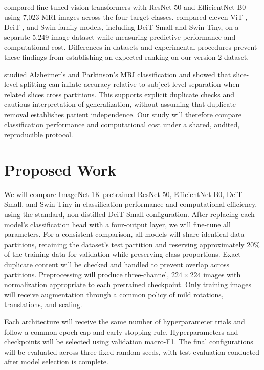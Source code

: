 \documentclass{article}
\begin{document}
\citet{reddy2024} compared fine-tuned vision transformers with ResNet-50 and EfficientNet-B0 using 7,023 MRI images across the four target classes. 
\citet{cakmak2025} compared eleven ViT-, DeiT-, and Swin-family models, including DeiT-Small and Swin-Tiny, on a separate 5,249-image dataset while measuring 
predictive performance and computational cost. Differences in datasets and experimental procedures prevent these findings from establishing an expected ranking on 
our version-2 dataset.

\citet{yagis2021} studied Alzheimer's and Parkinson's MRI classification and showed that slice-level splitting can inflate accuracy relative to subject-level 
separation when related slices cross partitions. This supports explicit duplicate checks and cautious interpretation of generalization, without assuming that 
duplicate removal establishes patient independence. Our study will therefore compare classification performance and computational cost under a shared, audited, 
reproducible protocol.

\section*{Proposed Work}
\setlength{\emergencystretch}{2em}
We will compare ImageNet-1K-pretrained ResNet-50, \mbox{EfficientNet-B0}, DeiT-Small, and Swin-Tiny in classification performance and computational efficiency, 
using the standard, non-distilled DeiT-Small configuration. After replacing each model's classification head with a four-output layer, we will fine-tune all
parameters. For a consistent comparison, all models will share identical data partitions, retaining the dataset's test partition and reserving approximately 20\%
of the training data for validation while preserving class proportions. Exact duplicate content will be checked and handled to prevent overlap across partitions.
Preprocessing will produce three-channel, \(224 \times 224\) images with normalization appropriate to each pretrained checkpoint. Only training images will 
receive augmentation through a common policy of mild rotations, translations, and scaling.

Each architecture will receive the same number of hyperparameter trials and follow a common epoch cap and early-stopping rule. Hyperparameters and checkpoints 
will be selected using validation macro-F1. The final configurations will be evaluated across three fixed random seeds, with test evaluation conducted after model
selection is complete. 
\end{document}
